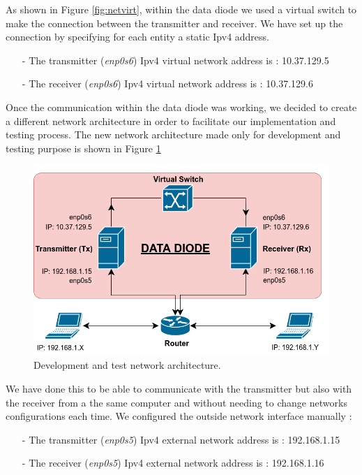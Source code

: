 \documentclass[a4paper,10pt]{article}
\begin{document}
As shown in Figure \ref{fig:netvirt}, within the data diode we used a virtual switch to make the connection between the transmitter and receiver. We have set up the connection by specifying for each entity a static Ipv4 address. 
\begin{enumerate}
\item[-] The transmitter (\emph{enp0s6}) Ipv4 virtual network address is : 10.37.129.5
\item[-] The receiver (\emph{enp0s6}) Ipv4 virtual network address is : 10.37.129.6
\end{enumerate}

Once the communication within the data diode was working, we decided to create a different network architecture in order to facilitate our implementation and testing process. The new network architecture made only for development and testing purpose is shown in Figure \ref{fig:nettest}
\begin{figure}[!h]
\centering
\includegraphics[scale=0.5]{images/schema1.png}
\caption{Development and test network architecture.}
\label{fig:nettest}
\end{figure}
We have done this to be able to communicate with the transmitter but also with the receiver from a the same computer and without needing to change networks configurations each time. We configured the outside network interface manually :
\begin{enumerate}
\item[-] The transmitter (\emph{enp0s5}) Ipv4 external network address is : 192.168.1.15
\item[-] The receiver (\emph{enp0s5}) Ipv4 external network address is : 192.168.1.16
\end{enumerate}
\end{document}
